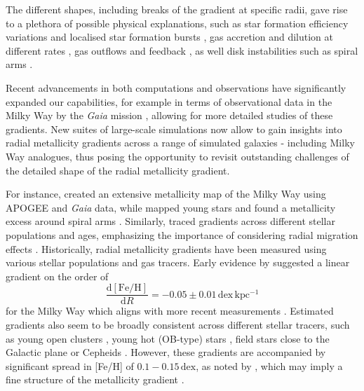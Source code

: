 \documentclass[fleqn,usenatbib]{mnras}
\begin{document}
The different shapes, including breaks of the gradient at specific radii, gave rise to a plethora of possible physical explanations, such as star formation efficiency variations and localised star formation bursts \citep{Sanchez2014, SanchezBlazquez2014, Ho2015}, gas accretion and dilution at different rates \citep{Bresolin2012, Sanchez2013, Belfiore2016, SanchezMenguiano2016}, gas outflows and feedback \citep{Lilly2013, Ma2017b}, as well disk instabilities such as spiral arms \citep{Grand2016, Ho2017c}.

Recent advancements in both computations and observations have significantly expanded our capabilities, for example in terms of observational data in the Milky Way by the \textit{Gaia} mission \citep{Gaia-Collaboration2016}, allowing for more detailed studies of these gradients. New suites of large-scale simulations now allow to gain insights into radial metallicity gradients across a range of simulated galaxies - including Milky Way analogues, thus posing the opportunity to revisit outstanding challenges of the detailed shape of the radial metallicity gradient.

For instance, \citet{Hogg2019} created an extensive metallicity map of the Milky Way using APOGEE and \textit{Gaia} data, while \citet{Poggio2022} mapped young stars and found a metallicity excess around spiral arms \citep[see also][]{Zari2018, Zari2021, Poggio2021, Hackshaw2024}. Similarly, \citet[][among others]{Imig2023} traced gradients across different stellar populations and ages, emphasizing the importance of considering radial migration effects \citep{Binney2008, Frankel2018, Frankel2020}. Historically, radial metallicity gradients have been measured using various stellar populations and gas tracers. Early evidence by \citet{Janes1979} suggested a linear gradient on the order of
\begin{equation}
\frac{\mathrm{d{[Fe/H]}}}{\mathrm{d}R} = -0.05 \pm 0.01\,\mathrm{dex\,kpc^{-1}}
\end{equation}
for the Milky Way which aligns with more recent measurements \citep{Anders2017, Hayden2015}. Estimated gradients also seem to be broadly consistent across different stellar tracers, such as young open clusters \citep[e.g.][]{Yong2012, Cunha2016, Magrini2017, Casamiquela2019, Donor2020, Spina2021,Myers2022}, young hot (OB-type) stars \citep{Zari2018, Zari2021, Poggio2021, Poggio2022}, field stars close to the Galactic plane \citep[e.g.][]{Bergemann2014} or Cepheids \citep{Andrievsky2002, Andrievsky2002b, Lemasle2007, Lemasle2013}. However, these gradients are accompanied by significant spread in [Fe/H] of $0.1-0.15\,\mathrm{dex}$, as noted by \citet{Twarog1980}, which may imply a fine structure of the metallicity gradient \citep[see][]{Genovali2014}.
\end{document}
